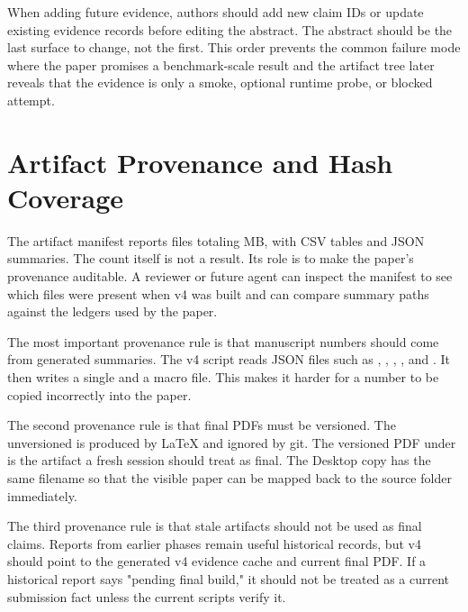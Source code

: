 When adding future evidence, authors should add new claim IDs or update
existing evidence records before editing the abstract. The abstract should be
the last surface to change, not the first. This order prevents the common
failure mode where the paper promises a benchmark-scale result and the artifact
tree later reveals that the evidence is only a smoke, optional runtime probe,
or blocked attempt.

\section{Artifact Provenance and Hash Coverage}
\label{app:artifact-provenance}

The artifact manifest reports \VFourWAMArtifactFiles{} files totaling
\VFourWAMArtifactTotalMB{} MB, with \VFourWAMArtifactCSV{} CSV tables and
\VFourWAMArtifactJSON{} JSON summaries. The count itself is not a result. Its
role is to make the paper's provenance auditable. A reviewer or future agent
can inspect the manifest to see which files were present when v4 was built and
can compare summary paths against the ledgers used by the paper.

The most important provenance rule is that manuscript numbers should come from
generated summaries. The v4 script reads JSON files such as
,
,
,
, and
. It then writes a single
 and a macro file. This makes it harder for a number to be
copied incorrectly into the paper.

The second provenance rule is that final PDFs must be versioned. The
unversioned  is produced by \LaTeX{} and ignored by
git. The versioned PDF under  is the artifact a fresh
session should treat as final. The Desktop copy has the same filename so that
the visible paper can be mapped back to the source folder immediately.

The third provenance rule is that stale artifacts should not be used as final
claims. Reports from earlier phases remain useful historical records, but v4
should point to the generated v4 evidence cache and current final PDF. If a
historical report says "pending final build," it should not be treated as a
current submission fact unless the current scripts verify it.


